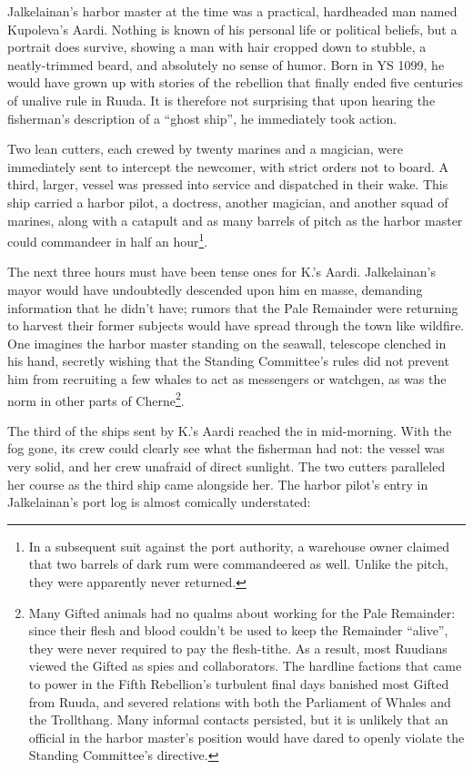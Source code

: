 \documentclass[12pt]{report}
\begin{document}
Jalkelainan's harbor master at the time was a practical, hardheaded
man named Kupoleva's Aardi.  Nothing is known of his personal life or
political beliefs, but a portrait does survive, showing a man with
hair cropped down to stubble, a neatly-trimmed beard, and absolutely
no sense of humor.  Born in YS 1099, he would have grown up with
stories of the rebellion that finally ended five centuries of unalive
rule in Ruuda.  It is therefore not surprising that upon hearing the
fisherman's description of a ``ghost ship'', he immediately took action.

Two lean cutters, each crewed by twenty marines and a magician, were
immediately sent to intercept the newcomer, with strict orders not to
board.  A third, larger, vessel was pressed into service and
dispatched in their wake.  This ship carried a harbor pilot, a
doctress, another magician, and another squad of marines, along with a
catapult and as many barrels of pitch as the harbor master could
commandeer in half an hour\footnote{In a subsequent suit against the
port authority, a warehouse owner claimed that two barrels of dark rum
were commandeered as well.  Unlike the pitch, they were apparently
never returned.}.

The next three hours must have been tense ones for K.'s Aardi.
Jalkelainan's mayor would have undoubtedly descended upon him en
masse, demanding information that he didn't have; rumors that the Pale
Remainder were returning to harvest their former subjects would have
spread through the town like wildfire.  One imagines the harbor master
standing on the seawall, telescope clenched in his hand, secretly
wishing that the Standing Committee's rules did not prevent him from
recruiting a few whales to act as messengers or watchgen, as was the
norm in other parts of Cherne\footnote{Many Gifted animals had no
qualms about working for the Pale Remainder: since their flesh and
blood couldn't be used to keep the Remainder ``alive'', they were never
required to pay the flesh-tithe.  As a result, most Ruudians viewed
the Gifted as spies and collaborators.  The hardline factions that
came to power in the Fifth Rebellion's turbulent final days banished
most Gifted from Ruuda, and severed relations with both the Parliament
of Whales and the Trollthang.  Many informal contacts persisted, but
it is unlikely that an official in the harbor master's position would
have dared to openly violate the Standing Committee's directive.}.

The third of the ships sent by K.'s Aardi reached the {\UL} in
mid-morning.  With the fog gone, its crew could clearly see what the
fisherman had not: the vessel was very solid, and her crew unafraid of
direct sunlight.  The two cutters paralleled her course as the third
ship came alongside her.  The harbor pilot's entry in Jalkelainan's
port log is almost comically understated:
\end{document}
